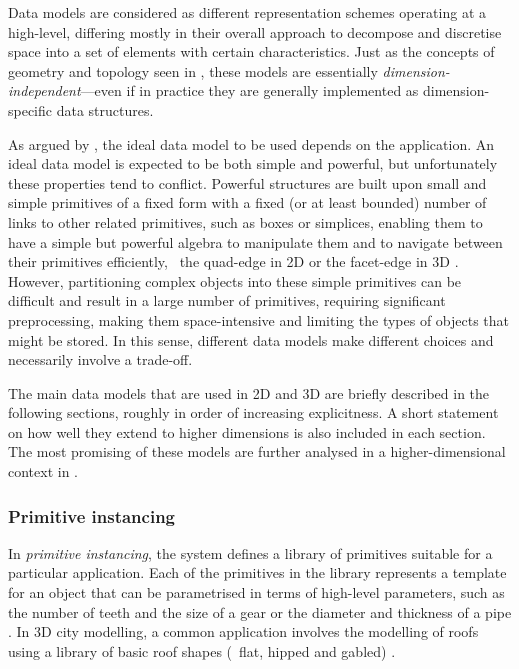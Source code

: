 Data models are considered as different representation schemes operating at a high-level, differing mostly in their overall approach to decompose and discretise space into a set of elements with certain characteristics.
Just as the concepts of geometry and topology seen in , these models are essentially \emph{dimension-independent}---even if in practice they are generally implemented as dimension-specific data structures.

As argued by \citet{McKenzie01}, the ideal data model to be used depends on the application.
An ideal data model is expected to be both simple and powerful, but unfortunately these properties tend to conflict.
Powerful structures are built upon small and simple primitives of a fixed form with a fixed (or at least bounded) number of links to other related primitives, such as boxes or simplices, enabling them to have a simple but powerful algebra to manipulate them and to navigate between their primitives efficiently, \eg\ the quad-edge in 2D \citep{Guibas85} or the facet-edge in 3D \citep{Dobkin87}.
However, partitioning complex objects into these simple primitives can be difficult and result in a large number of primitives, requiring significant preprocessing, making them space-intensive and limiting the types of objects that might be stored.
In this sense, different data models make different choices and necessarily involve a trade-off.

The main data models that are used in 2D and 3D are briefly described in the following sections, roughly in order of increasing explicitness.
A short statement on how well they extend to higher dimensions is also included in each section.
The most promising of these models are further analysed in a higher-dimensional context in .

\subsubsection{Primitive instancing}

In \emph{primitive instancing}, the system defines a library of primitives suitable for a particular application.
Each of the primitives in the library represents a template for an object that can be parametrised in terms of high-level parameters, such as the number of teeth and the size of a gear or the diameter and thickness of a pipe \citep{Foley95}.
In 3D city modelling, a common application involves the modelling of roofs using a library of basic roof shapes (\eg\ flat, hipped and gabled) \citep{Kada07}.

